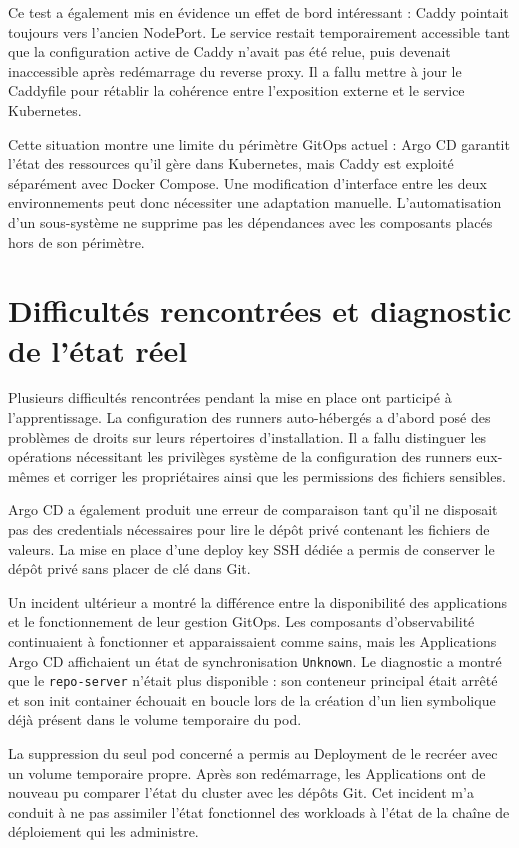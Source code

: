 Ce test a également mis en évidence un effet de bord intéressant : Caddy pointait toujours vers l'ancien NodePort. Le service restait temporairement accessible tant que la configuration active de Caddy n'avait pas été relue, puis devenait inaccessible après redémarrage du reverse proxy. Il a fallu mettre à jour le Caddyfile pour rétablir la cohérence entre l'exposition externe et le service Kubernetes.

Cette situation montre une limite du périmètre GitOps actuel : Argo CD garantit l'état des ressources qu'il gère dans Kubernetes, mais Caddy est exploité séparément avec Docker Compose. Une modification d'interface entre les deux environnements peut donc nécessiter une adaptation manuelle. L'automatisation d'un sous-système ne supprime pas les dépendances avec les composants placés hors de son périmètre.

\section{Difficultés rencontrées et diagnostic de l'état réel}

Plusieurs difficultés rencontrées pendant la mise en place ont participé à l'apprentissage. La configuration des runners auto-hébergés a d'abord posé des problèmes de droits sur leurs répertoires d'installation. Il a fallu distinguer les opérations nécessitant les privilèges système de la configuration des runners eux-mêmes et corriger les propriétaires ainsi que les permissions des fichiers sensibles.

Argo CD a également produit une erreur de comparaison tant qu'il ne disposait pas des credentials nécessaires pour lire le dépôt privé contenant les fichiers de valeurs. La mise en place d'une deploy key SSH dédiée a permis de conserver le dépôt privé sans placer de clé dans Git.

Un incident ultérieur a montré la différence entre la disponibilité des applications et le fonctionnement de leur gestion GitOps. Les composants d'observabilité continuaient à fonctionner et apparaissaient comme sains, mais les Applications Argo CD affichaient un état de synchronisation \texttt{Unknown}. Le diagnostic a montré que le \texttt{repo-server} n'était plus disponible : son conteneur principal était arrêté et son init container échouait en boucle lors de la création d'un lien symbolique déjà présent dans le volume temporaire du pod.

La suppression du seul pod concerné a permis au Deployment de le recréer avec un volume temporaire propre. Après son redémarrage, les Applications ont de nouveau pu comparer l'état du cluster avec les dépôts Git. Cet incident m'a conduit à ne pas assimiler l'état fonctionnel des workloads à l'état de la chaîne de déploiement qui les administre.

